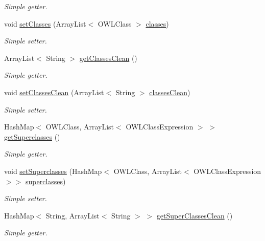 \begin{DoxyCompactItemize}
\begin{DoxyCompactList}\small\item\em Simple getter. \end{DoxyCompactList}\item 
void \hyperlink{class_ontology_1_1_ontology_ab9d088ebcfd87b648bacd0053f402158}{setClasses} (ArrayList$<$ OWLClass $>$ \hyperlink{class_ontology_1_1_ontology_a60484a66d42244f83c944d7fd7f67fcf}{classes})
\begin{DoxyCompactList}\small\item\em Simple setter. \end{DoxyCompactList}\item 
ArrayList$<$ String $>$ \hyperlink{class_ontology_1_1_ontology_a1cad18775a94610a7c563dfcdbfe7ab5}{getClassesClean} ()
\begin{DoxyCompactList}\small\item\em Simple getter. \end{DoxyCompactList}\item 
void \hyperlink{class_ontology_1_1_ontology_ab2984f2e5d7012029fd6d98d1447433a}{setClassesClean} (ArrayList$<$ String $>$ \hyperlink{class_ontology_1_1_ontology_a35b7af950c4bd1f698fcf18cb38f4e02}{classesClean})
\begin{DoxyCompactList}\small\item\em Simple setter. \end{DoxyCompactList}\item 
HashMap$<$ OWLClass, ArrayList$<$ OWLClassExpression $>$ $>$ \hyperlink{class_ontology_1_1_ontology_a1e791e04e11967cadc062b5c23344980}{getSuperclasses} ()
\begin{DoxyCompactList}\small\item\em Simple getter. \end{DoxyCompactList}\item 
void \hyperlink{class_ontology_1_1_ontology_a54171d4f7b19e9743391140af5a328af}{setSuperclasses} (HashMap$<$ OWLClass, ArrayList$<$ OWLClassExpression $>$$>$ \hyperlink{class_ontology_1_1_ontology_a0a5224da294ff4af352081031305f799}{superclasses})
\begin{DoxyCompactList}\small\item\em Simple setter. \end{DoxyCompactList}\item 
HashMap$<$ String, ArrayList$<$ String $>$ $>$ \hyperlink{class_ontology_1_1_ontology_a351af5bb1b50f3c68f9ea90b05e035a5}{getSuperClassesClean} ()
\begin{DoxyCompactList}\small\item\em Simple getter. \end{DoxyCompactList}\item 
$$
\end{DoxyCompactItemize}
